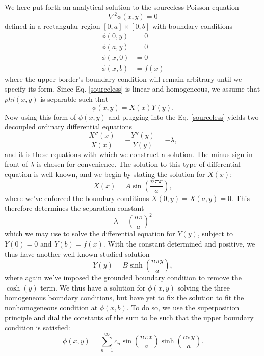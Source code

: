 \documentclass[reprint, amsmath, amssymb, aps, floatfix]{revtex4-1}
\begin{document}
We here put forth an analytical solution to the sourceless Poisson equation \begin{equation}
\nabla^2\phi(x,y)=0 \label{sourceless}
\end{equation} defined in a rectangular region $[0, a]\times [0, b]$ with boundary conditions
\begin{equation}
\begin{aligned}
\phi(0, y) &= 0 \\
\phi(a, y) &= 0\\
\phi(x, 0) &= 0\\
\phi(x, b) &= f(x)
\end{aligned}
\end{equation} where the upper border's boundary condition will remain arbitrary until we specify its form. Since Eq. \ref{sourceless} is linear and homogeneous, we assume that $phi(x,y)$ is separable such that \begin{equation} \phi(x,y)=X(x)Y(y). \label{separable} \end{equation} Now using this form of $\phi(x,y)$ and plugging into the Eq. \ref{sourceless} yields two decoupled ordinary differential equations \begin{equation}
\frac{X''(x)}{X(x)} = -\frac{Y''(y)}{Y(y)} = - \lambda, \label{separated}
\end{equation} and it is these equations with which we construct a solution. The minus sign in front of $\lambda$ is chosen for convenience. The solution to this type of differential equation is well-known, and we begin by stating the solution for $X(x)$: \begin{equation}
X(x) = A\sin\left(\frac{n\pi x}{a}\right), \label{xeq}
\end{equation} where we've enforced the boundary conditions $X(0, y)=X(a, y)=0$. This therefore determines the separation constant \begin{equation}
\lambda = \left(\frac{n\pi}{a}\right)^2 \label{lambda}
\end{equation} which we may use to solve the differential equation for $Y(y)$, subject to $Y(0)=0$ and $Y(b)=f(x)$. With the constant determined and positive, we thus have another well known studied solution \begin{equation}
Y(y) = B\sinh\left(\frac{n\pi y}{a}\right), \label{yeq}
\end{equation} where again we've imposed the grounded boundary condition to remove the $\cosh(y)$ term. We thus have a solution for $\phi(x,y)$ solving the three homogeneous boundary conditions, but have yet to fix the solution to fit the nonhomogeneous condition at $\phi(x,b)$. To do so, we use the superposition principle and dial the constants of the sum to be such that the upper boundary condition is satisfied: \begin{equation}
\phi(x,y)=\sum_{n=1}^\infty c_n \sin\left(\frac{n\pi x}{a}\right)\sinh\left(\frac{n\pi y}{a}\right) \label{phisum}.
\end{equation}
\end{document}
